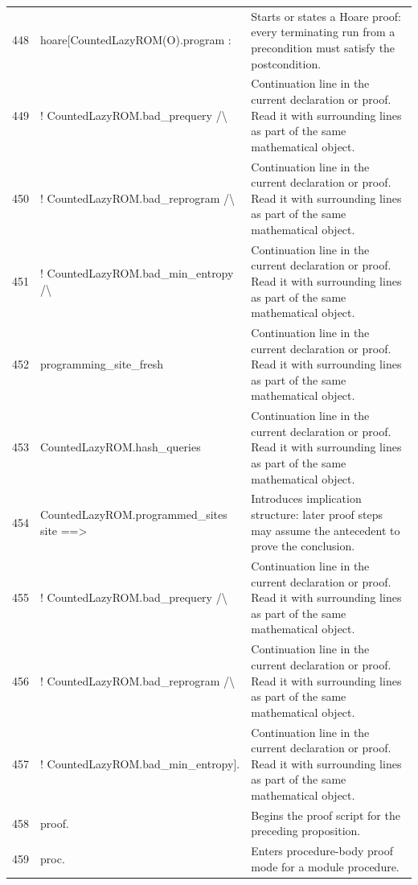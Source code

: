\documentclass[10pt]{article}
\begin{document}
\begin{longtable}{r L{0.53\textwidth} L{0.37\textwidth}}
448 & {\ttfamily\scriptsize   hoare[CountedLazyROM(O).program :} & Starts or states a Hoare proof: every terminating run from a precondition must satisfy the postcondition. \\
449 & {\ttfamily\scriptsize     ! CountedLazyROM.bad\_prequery /\textbackslash{}} & Continuation line in the current declaration or proof.  Read it with surrounding lines as part of the same mathematical object. \\
450 & {\ttfamily\scriptsize     ! CountedLazyROM.bad\_reprogram /\textbackslash{}} & Continuation line in the current declaration or proof.  Read it with surrounding lines as part of the same mathematical object. \\
451 & {\ttfamily\scriptsize     ! CountedLazyROM.bad\_min\_entropy /\textbackslash{}} & Continuation line in the current declaration or proof.  Read it with surrounding lines as part of the same mathematical object. \\
452 & {\ttfamily\scriptsize     programming\_site\_fresh} & Continuation line in the current declaration or proof.  Read it with surrounding lines as part of the same mathematical object. \\
453 & {\ttfamily\scriptsize       CountedLazyROM.hash\_queries} & Continuation line in the current declaration or proof.  Read it with surrounding lines as part of the same mathematical object. \\
454 & {\ttfamily\scriptsize       CountedLazyROM.programmed\_sites site ==>} & Introduces implication structure: later proof steps may assume the antecedent to prove the conclusion. \\
455 & {\ttfamily\scriptsize     ! CountedLazyROM.bad\_prequery /\textbackslash{}} & Continuation line in the current declaration or proof.  Read it with surrounding lines as part of the same mathematical object. \\
456 & {\ttfamily\scriptsize     ! CountedLazyROM.bad\_reprogram /\textbackslash{}} & Continuation line in the current declaration or proof.  Read it with surrounding lines as part of the same mathematical object. \\
457 & {\ttfamily\scriptsize     ! CountedLazyROM.bad\_min\_entropy].} & Continuation line in the current declaration or proof.  Read it with surrounding lines as part of the same mathematical object. \\
458 & {\ttfamily\scriptsize proof.} & Begins the proof script for the preceding proposition. \\
459 & {\ttfamily\scriptsize proc.} & Enters procedure-body proof mode for a module procedure. \\

\end{longtable}
\end{document}
